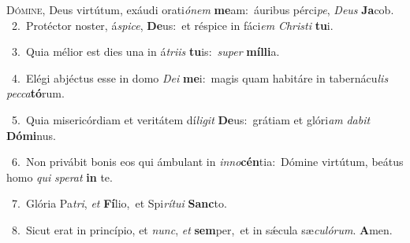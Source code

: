 \lettrine{\initial\textcolor{\initialcolor}{D}}{ómine,} Deus virtútum, exáudi orati\-\textit{ó}\-\textit{nem} \textbf{me}\-am:~\star áuribus pérci\-\textit{pe}\-, \textit{De}\-\textit{us} \textbf{Ja}\-cob.\\
{\numbfont\textcolor{\numbcolor}{~2.}}~Protéctor noster, á\-\textit{spi}\-\textit{ce}, \textbf{De}\-us:~\star et réspice in fáci\textit{em} \textit{Chris}\-\textit{ti} \textbf{tu}\-i.\par
{\numbfont\textcolor{\numbcolor}{~3.}}~Quia mélior est dies una in á\-\textit{tri}\-\textit{is} \textbf{tu}\-is:~\star \textit{su}\-\textit{per} \textbf{míl}\-\textbf{li}a.\par
{\numbfont\textcolor{\numbcolor}{~4.}}~Elégi abjéctus esse in domo \textit{De}\-\textit{i} \textbf{me}\-i:~\star magis quam habitáre in tabernácu\textit{lis} \textit{pec}\-\textit{ca}\textbf{tó}rum.\par
{\numbfont\textcolor{\numbcolor}{~5.}}~Quia misericórdiam et veritátem dí\-\textit{li}\-\textit{git} \textbf{De}\-us:~\star grátiam et glóri\textit{am} \textit{da}\-\textit{bit} \textbf{Dó}\-\textbf{mi}nus.\par
{\numbfont\textcolor{\numbcolor}{~6.}}~Non privábit bonis eos qui ámbulant in \textit{in}\-\textit{no}\textbf{cén}tia:~\star Dómine virtútum, beátus homo \textit{qui} \textit{spe}\-\textit{rat} \textbf{in} te.\par
{\numbfont\textcolor{\numbcolor}{~7.}}~Glória Pa\-\textit{tri}\-, \textit{et} \textbf{Fí}\-lio,~\star et Spi\-\textit{rí}\-\textit{tu}\textit{i} \textbf{Sanc}\-to.\par
{\numbfont\textcolor{\numbcolor}{~8.}}~Sicut erat in princípio, et \textit{nunc}\-, \textit{et} \textbf{sem}\-per,~\star et in sǽcula sæ\-\textit{cu}\-\textit{ló}\textit{rum}. \textbf{A}\-men.\par
